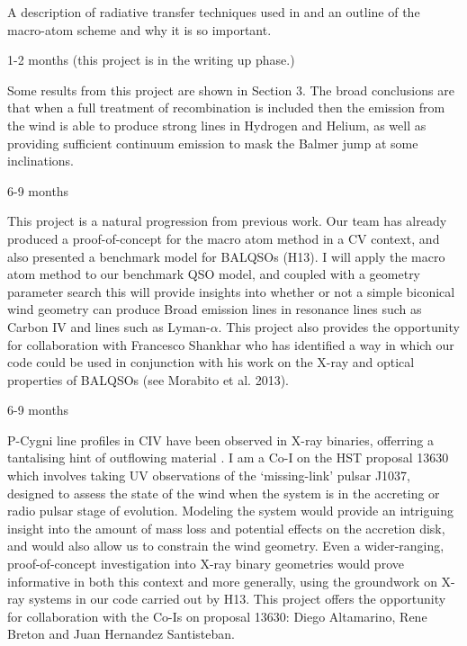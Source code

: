\documentclass[useAMS,usenatbib,onecolumn]{mn2e2}
\begin{document}
\bigskip

 A description of radiative transfer techniques used in \py and an outline of the macro-atom scheme and why it is so important.

\bigskip


 1-2 months (this project is in the writing up phase.)

 Some results from this project are shown in Section 3. The broad conclusions are that when a full treatment of recombination is included then the emission from the wind is able to produce strong lines in Hydrogen and Helium, as well as providing 
sufficient continuum emission to mask the Balmer jump at some inclinations.

\bigskip


 6-9 months

 This project is a natural progression from previous work. Our team 
has already produced a proof-of-concept for the macro atom method in a CV context, and 
also presented a benchmark model for BALQSOs (H13). I will apply the macro atom method
to our benchmark QSO model, and coupled with a geometry parameter search this will provide insights
into whether or not a simple biconical wind geometry can produce Broad emission lines in 
resonance lines such as Carbon IV and lines such as Lyman-$\alpha$. This project
also provides the opportunity for collaboration with Francesco Shankhar who has identified
a way in which our code could be used in conjunction with his work
on the X-ray and optical properties of BALQSOs (see Morabito et al. 2013\nocite{morabito2013}).

\bigskip


 6-9 months

 P-Cygni line profiles in CIV have been observed in X-ray binaries,
offerring a tantalising hint of outflowing material \citep{ioannau2003}. I am a Co-I on the HST proposal 13630 which involves taking UV observations of the `missing-link' pulsar J1037, designed to assess the state of the wind when the system is in the accreting 
or radio pulsar stage of evolution. Modeling the system would provide an intriguing insight 
into the amount of mass loss and potential effects on the accretion disk, and would also
allow us to constrain the wind geometry. Even a wider-ranging, proof-of-concept investigation into
X-ray binary geometries would prove informative in both this context and more generally, using the groundwork
on X-ray systems in our code carried out by H13. This project offers the opportunity 
for collaboration with the Co-Is on proposal 13630: Diego Altamarino, Rene Breton
and Juan Hernandez Santisteban.
\end{document}
